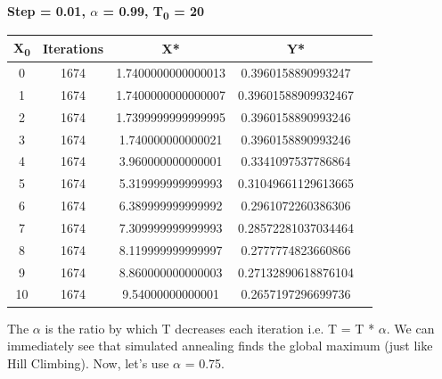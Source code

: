 \documentclass[paper=a4, fontsize=11pt]{scrartcl} %
\numberwithin{equation}{section} %
\numberwithin{figure}{section} %
\numberwithin{table}{section} %
\begin{document}
\begin{center}
\textbf{Step = 0.01, \(\alpha\) = 0.99, T\textsubscript{0} = 20 \\}
\begin{tabular}{ |c|c|c|c|c| } 
	\hline
	\textbf{X\textsubscript{0}} & \textbf{Iterations} & \textbf{X*} & \textbf{Y*} \\ 
	\hline
    0 & 1674 & 1.7400000000000013 & 0.3960158890993247 \\
    1 & 1674 & 1.7400000000000007 & 0.39601588909932467 \\
    2 & 1674 & 1.7399999999999995 & 0.3960158890993246 \\
    3 & 1674 & 1.740000000000021 & 0.3960158890993246 \\
    4 & 1674 & 3.960000000000001 & 0.3341097537786864 \\
    5 & 1674 & 5.319999999999993 & 0.31049661129613665 \\
    6 & 1674 & 6.389999999999992 & 0.2961072260386306 \\
    7 & 1674 & 7.309999999999993 & 0.28572281037034464 \\
    8 & 1674 & 8.119999999999997 & 0.2777774823660866 \\
    9 & 1674 & 8.860000000000003 & 0.27132890618876104 \\
    10 & 1674 & 9.54000000000001 & 0.2657197296699736 \\
	\hline
\end{tabular}
\end{center}

The \(\alpha\) is the ratio by which T decreases each iteration i.e. T = T * \(\alpha\).
We can immediately see that simulated annealing finds the global maximum (just like Hill Climbing). Now, let's use \(\alpha\) = 0.75.
\end{document}
